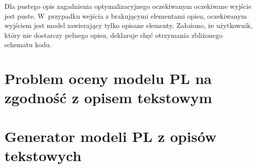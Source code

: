 Dla pustego opis zagadnienia optymalizacyjnego oczekiwanym oczekiwane wyjście jest puste. W~przypadku wejścia z brakującymi elementami opisu, oczekiwanym wyjściem jest model zawierający tylko opisane elementy. Założono, że użytkownik, który nie dostarczy pełnego opisu, deklaruje chęć otrzymania zbliżonego schematu kodu. %

\section{Problem oceny modelu PL na zgodność z opisem tekstowym}







\section{Generator modeli PL z opisów tekstowych}


